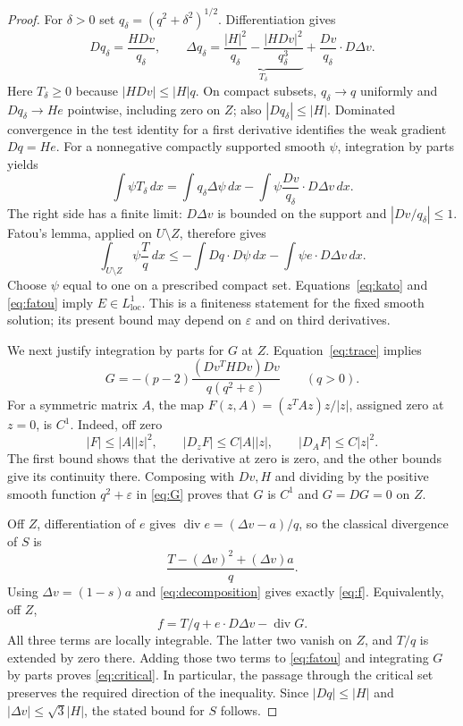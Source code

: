 \documentclass[11pt]{article}
\theoremstyle{remark}
\newcommand{\loc}{\mathrm{loc}}
\newcommand{\dd}{\,dx}
\newcommand{\diver}{\operatorname{div}}
\newcommand{\eps}{\varepsilon}
\begin{document}
\begin{proof}
For $\delta>0$ set $q_\delta=(q^2+\delta^2)^{1/2}$. Differentiation gives
\[
 Dq_\delta=\frac{HDv}{q_\delta},\qquad
 \Delta q_\delta=
 \underbrace{\frac{|H|^2}{q_\delta}
   -\frac{|HDv|^2}{q_\delta^3}}_{T_\delta}
 +\frac{Dv}{q_\delta}\cdot D\Delta v.
\]
Here $T_\delta\geq0$ because $|HDv|\leq|H|q$.
On compact subsets, $q_\delta\to q$ uniformly and
$Dq_\delta\to He$ pointwise, including zero on $Z$;
also $|Dq_\delta|\leq|H|$. Dominated convergence in the test
identity for a first derivative identifies the weak gradient
$Dq=He$.
For a nonnegative compactly supported smooth $\psi$, integration by
parts yields
\[
 \int\psi T_\delta\dd
 =\int q_\delta\Delta\psi\dd
   -\int\psi\frac{Dv}{q_\delta}\cdot D\Delta v\dd.
\]
The right side has a finite limit: $D\Delta v$ is bounded on the
support and $|Dv/q_\delta|\leq1$. Fatou's lemma, applied on $U\setminus Z$,
therefore gives
\begin{equation}\label{eq:fatou}
 \int_{U\setminus Z}\psi\frac Tq\dd
 \leq-\int Dq\cdot D\psi\dd
       -\int\psi e\cdot D\Delta v\dd.
\end{equation}
Choose $\psi$ equal to one on a prescribed compact set.
Equations~\eqref{eq:kato} and \eqref{eq:fatou} imply
$E\in L^1_{\loc}$. This is a finiteness statement for the
fixed smooth solution; its present bound may depend on $\eps$
and on third derivatives.

We next justify integration by parts for $G$ at $Z$.
Equation~\eqref{eq:trace} implies
\begin{equation}\label{eq:G}
 G=-(p-2)\frac{(Dv^THDv)Dv}{q(q^2+\eps)}\qquad(q>0).
\end{equation}
For a symmetric matrix $A$, the map
$F(z,A)=(z^TAz)z/|z|$, assigned zero at $z=0$, is $C^1$.
Indeed, off zero
\[
 |F|\leq |A||z|^2,\qquad
 |D_zF|\leq C|A||z|,\qquad |D_AF|\leq C|z|^2.
\]
The first bound shows that the derivative at zero is zero,
and the other bounds give its continuity there. Composing with
$Dv,H$ and dividing by the positive smooth function $q^2+\eps$
in \eqref{eq:G} proves that $G$ is $C^1$ and $G=DG=0$ on $Z$.

Off $Z$, differentiation of $e$ gives
$\diver e=(\Delta v-a)/q$, so the classical divergence of $S$ is
\[
 \frac{T-(\Delta v)^2+(\Delta v)a}{q}.
\]
Using $\Delta v=(1-s)a$ and \eqref{eq:decomposition} gives exactly
\eqref{eq:f}. Equivalently, off $Z$,
\[
 f=T/q+e\cdot D\Delta v-\diver G.
\]
All three terms are locally integrable. The latter two vanish on
$Z$, and $T/q$ is extended by zero there. Adding those two terms
to \eqref{eq:fatou} and integrating $G$ by parts proves
\eqref{eq:critical}. In particular, the passage through the
critical set preserves the required direction of the inequality.
Since $|Dq|\leq|H|$ and $|\Delta v|\leq\sqrt3|H|$, the stated bound
for $S$ follows.


\end{proof}
\end{document}
